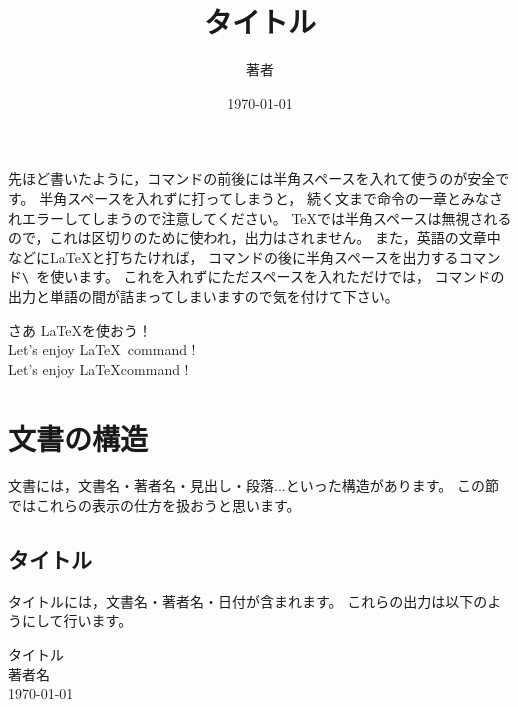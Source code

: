 先ほど書いたように，コマンドの前後には半角スペースを入れて使うのが安全です。
半角スペースを入れずに打ってしまうと，
続く文まで命令の一章とみなされエラーしてしまうので注意してください。
{\TeX}では半角スペースは無視されるので，これは区切りのために使われ，出力はされません。
また，英語の文章中などに{\LaTeX}と打ちたければ，
コマンドの後に半角スペースを出力するコマンド\verb*|\ |を使います。
これを入れずにただスペースを入れただけでは，
コマンドの出力と単語の間が詰まってしまいますので気を付けて下さい。

\begin{IOTeX}
さあ \LaTeX を使おう！\\
Let's enjoy \LaTeX \ command ! \\
Let's enjoy \LaTeX command ! \\
\end{IOTeX}



\section{文書の構造}
文書には，文書名・著者名・見出し・段落...といった構造があります。
この節ではこれらの表示の仕方を扱おうと思います。


\subsection{タイトル}
タイトルには，文書名・著者名・日付が含まれます。
これらの出力は以下のようにして行います。

\begin{IOtcb}
\begin{verbatim*}
\title{タイトル}
\author{著者}
\date{\today}
\maketitle
\end{verbatim*}
\tcblower
\vspace{\baselineskip}
\begin{center}

{\LARGE{タイトル}} \\
\vspace{5pt}
著者名 \\
\vspace{2pt}
\today

\end{center}
\vspace*{\baselineskip}
\end{IOtcb}

